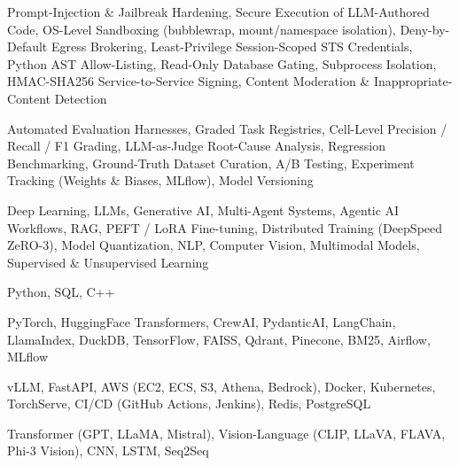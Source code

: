 \documentclass[letter,10pt]{article}
\begin{document}
 Prompt-Injection \& Jailbreak Hardening, Secure Execution of LLM-Authored Code, OS-Level Sandboxing (bubblewrap, mount/namespace isolation), Deny-by-Default Egress Brokering, Least-Privilege Session-Scoped STS Credentials, Python AST Allow-Listing, Read-Only Database Gating, Subprocess Isolation, HMAC-SHA256 Service-to-Service Signing, Content Moderation \& Inappropriate-Content Detection\par\vspace{2pt}

 Automated Evaluation Harnesses, Graded Task Registries, Cell-Level Precision / Recall / F1 Grading, LLM-as-Judge Root-Cause Analysis, Regression Benchmarking, Ground-Truth Dataset Curation, A/B Testing, Experiment Tracking (Weights \& Biases, MLflow), Model Versioning\par\vspace{2pt}

 Deep Learning, LLMs, Generative AI, Multi-Agent Systems, Agentic AI Workflows, RAG, PEFT / LoRA Fine-tuning, Distributed Training (DeepSpeed ZeRO-3), Model Quantization, NLP, Computer Vision, Multimodal Models, Supervised \& Unsupervised Learning\par\vspace{2pt}

 Python, SQL, C++\par\vspace{2pt}

 PyTorch, HuggingFace Transformers, CrewAI, PydanticAI, LangChain, LlamaIndex, DuckDB, TensorFlow, FAISS, Qdrant, Pinecone, BM25, Airflow, MLflow\par\vspace{2pt}

 vLLM, FastAPI, AWS (EC2, ECS, S3, Athena, Bedrock), Docker, Kubernetes, TorchServe, CI/CD (GitHub Actions, Jenkins), Redis, PostgreSQL\par\vspace{2pt}

 Transformer (GPT, LLaMA, Mistral), Vision-Language (CLIP, LLaVA, FLAVA, Phi-3 Vision), CNN, LSTM, Seq2Seq
\end{document}
